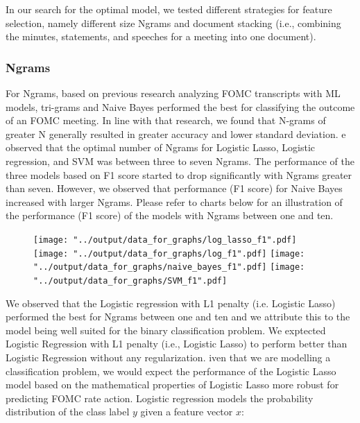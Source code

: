 \documentclass[11pt]{article}
\newcommand{\vertSpace}[1]{\vspace{3mm}}
\begin{document}
In our search for the optimal model, we tested different strategies for feature selection, namely different size Ngrams and document stacking (i.e., combining the minutes, statements, and speeches for a meeting into one document).  


\subsubsection{Ngrams}

For Ngrams, based on previous research analyzing FOMC transcripts \cite{stanford} with ML models, tri-grams and Naive Bayes performed the best for classifying the outcome of an FOMC meeting.  In line with that research, we found that N-grams of greater N generally resulted in greater accuracy and lower standard deviation.  \vertSpace


We observed that the optimal number of Ngrams for Logistic Lasso, Logistic regression, and SVM was between three to seven Ngrams.  The performance of the three models based on F1 score started to drop significantly with Ngrams greater than seven.  However, we observed that performance (F1 score) for Naive Bayes increased with larger Ngrams.  Please refer to charts below for an illustration of the performance (F1 score) of the models with Ngrams between one and ten. 


\begin{figure}[H]
\begin{center}
\texttt{[image: "../output/data\_for\_graphs/log\_lasso\_f1".pdf]}
\texttt{[image: "../output/data\_for\_graphs/log\_f1".pdf]}
\texttt{[image: "../output/data\_for\_graphs/naive\_bayes\_f1".pdf]}
\texttt{[image: "../output/data\_for\_graphs/SVM\_f1".pdf]}
\end{center}
\end{figure}



We observed that the Logistic regression with L1 penalty (i.e. Logistic Lasso) performed the best for Ngrams between one and ten and we attribute this to the model being well suited for the binary classification problem.  We exptected Logistic Regression with L1 penalty (i.e., Logistic Lasso) to perform better than Logistic Regression without any regularization.  \vertSpace 

Given that we are modelling a classification problem, we would expect the performance of the Logistic Lasso model based on the mathematical properties of Logistic Lasso more robust for predicting FOMC rate action.  Logistic regression models the probability distribution of the class label $y$ given a feature vector $x$: 
\end{document}
